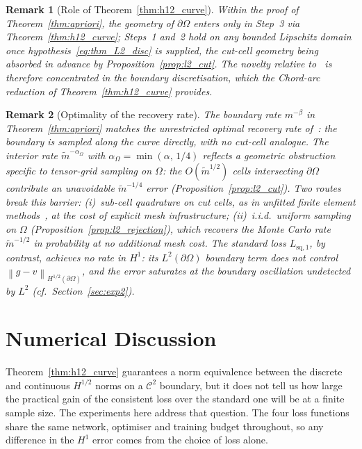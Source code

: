 \documentclass[11pt]{article}
\newtheorem{remark}{Remark}
\newcommand{\Omg}{\Omega}
\newcommand{\bOmg}{\partial\Omega}
\newcommand{\C}{\mathcal{C}}
\newcommand{\norm}[1]{\left\|#1\right\|}
\newcommand{\mtil}{\widetilde{m}}
\begin{document}
 


\begin{remark}[Role of Theorem~\ref{thm:h12_curve}]
Within the proof of Theorem~\ref{thm:apriori}, the geometry of $\bOmg$
enters only in Step~3 via Theorem~\ref{thm:h12_curve}; Steps~1 and~2
hold on any bounded Lipschitz domain once
hypothesis~\eqref{eq:thm_L2_disc} is supplied, the cut-cell geometry
being absorbed in advance by Proposition~\ref{prop:l2_cut}. The novelty
relative to~\cite{bonito2025} is therefore concentrated in the boundary
discretisation, which the \textit{Chord-arc} reduction of
Theorem~\ref{thm:h12_curve} provides.
\end{remark}
 
\begin{remark}[Optimality of the recovery rate]\label{rem:optimality}
The boundary rate $m^{-\beta}$ in Theorem~\ref{thm:apriori} matches
the unrestricted optimal recovery rate
of~\cite[Theorem~3.1]{bonito2025}: the boundary is sampled along the
curve directly, with no cut-cell analogue. The interior rate
$\mtil^{-\alpha_\Omega}$ with $\alpha_\Omega = \min(\alpha,\,1/4)$
reflects a geometric obstruction specific to \emph{tensor-grid}
sampling on $\Omg$: the $O(\mtil^{1/2})$ cells intersecting $\bOmg$
contribute an unavoidable $\mtil^{-1/4}$ error
(Proposition~\ref{prop:l2_cut}). Two routes break this barrier:
\textup{(i)}~sub-cell quadrature on cut cells, as in unfitted finite
element methods~\cite{li2026}, at the cost of explicit mesh
infrastructure; \textup{(ii)}~i.i.d.\ uniform sampling on $\Omg$
(Proposition~\ref{prop:l2_rejection}), which recovers the Monte Carlo
rate $\mtil^{-1/2}$ in probability at no additional mesh cost. The
standard loss $L_{\mathrm{sq},1}$, by contrast, achieves no rate in
$H^1$: its $L^2(\bOmg)$ boundary term does not control
$\norm{g-v}_{H^{1/2}(\bOmg)}$, and the error saturates at the
boundary oscillation undetected by $L^2$
(cf.\ Section~\ref{sec:exp2}).
\end{remark}
 



\section{Numerical Discussion}
\label{sec:numerics}

Theorem~\ref{thm:h12_curve} guarantees a norm equivalence between
the discrete and continuous $H^{1/2}$ norms on a $\C^2$ boundary,
but it does not tell us how large the practical gain of the
consistent loss over the standard one will be at a finite sample
size. The experiments here address that question. The four loss
functions share the same network, optimiser and training budget
throughout, so any difference in the $H^1$ error comes from the
choice of loss alone.
\end{document}
